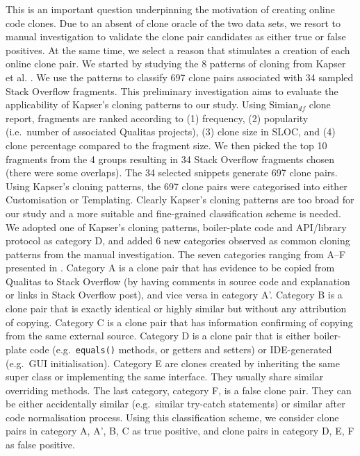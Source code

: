 \documentclass{sig-alternate-05-2015}
\begin{document}
This is an important question underpinning the motivation of creating online code clones. Due to an absent of clone oracle of the two data sets, we resort to manual investigation to validate the clone pair candidates as either true or false positives. At the same time, we select a reason that stimulates a creation of each online clone pair. %
We started by studying the 8 patterns of cloning from Kapser et al. \cite{Kapser2006,Kapser2008}. We use the patterns to classify 697 clone pairs associated with 34 sampled Stack Overflow fragments. This preliminary investigation aims to evaluate the applicability of Kapser's cloning patterns to our study. Using Simian$_{df}$ clone report, fragments are ranked according to (1) frequency, (2) popularity (i.e.~number of associated Qualitas projects), (3) clone size in SLOC, and (4) clone percentage compared to the fragment size. We then picked the top 10 fragments from the 4 groups resulting in 34 Stack Overflow fragments chosen (there were some overlaps). The 34 selected snippets generate 697 clone pairs. Using Kapser's cloning patterns, the 697 clone pairs were categorised into either Customisation or Templating. Clearly Kapser's cloning patterns are too broad for our study and a more suitable and fine-grained classification scheme is needed. We adopted one of Kapser's cloning patterns, boiler-plate code and API/library protocol as category D, and added 6 new categories observed as common cloning patterns from the manual investigation. The seven categories ranging from A--F presented in . Category A is a clone pair that has evidence to be copied from Qualitas to Stack Overflow (by having comments in source code and explanation or links in Stack Overflow post), and vice versa in category A'. Category B is a clone pair that is exactly identical or highly similar but without any attribution of copying. Category C is a clone pair that has information confirming of copying from the same external source. Category D is a clone pair that is either boiler-plate code (e.g.~\verb|equals()| methods, or getters and setters) or IDE-generated (e.g.~GUI initialisation). Category E are clones created by inheriting the same super class or implementing the same interface. They usually share similar overriding methods. The last category, category F, is a false clone pair. They can be either accidentally similar (e.g.~similar try-catch statements) or similar after code normalisation process. Using this classification scheme, we consider clone pairs in category A, A', B, C as true positive, and clone pairs in category D, E, F as false positive. 
\end{document}
